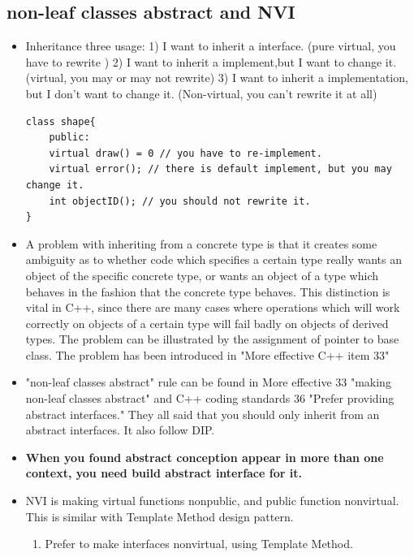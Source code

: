 \documentclass[a4paper,11pt,twoside]{book}
\begin{document}
\subsection{non-leaf classes abstract and NVI}

\begin{itemize}

\item Inheritance three usage: 1) I want to inherit a interface. (pure virtual, you have to rewrite ) 2) I want to inherit a implement,but I want to change it. (virtual, you may or may not rewrite) 3) I want to inherit a implementation, but I don't want to change it. (Non-virtual, you can't rewrite it at all)
\begin{lstlisting}[numbers=none]
class shape{
	public:
	virtual draw() = 0 // you have to re-implement.
	virtual error(); // there is default implement, but you may change it.
	int objectID(); // you should not rewrite it.
}	
\end{lstlisting}

	\item A problem with inheriting from a concrete type is that it creates some ambiguity as to whether code which specifies a certain type really wants an object of the specific concrete type, or wants an object of a type which behaves in the fashion that the concrete type behaves. This distinction is vital in C++, since there are many cases where operations which will work correctly on objects of a certain type will fail badly on objects of derived types. The problem can be illustrated by the assignment of pointer to base class. The problem has been introduced in "More effective C++ item 33"
	

	\item "non-leaf classes abstract" rule can be found in More effective 33 "making non-leaf classes abstract" and C++ coding standards 36 "Prefer providing abstract interfaces." They all said that you should only inherit from an abstract interfaces. It also follow DIP.

	\item \textbf{When you found abstract conception appear in more than one context, you need build abstract interface for it. }


	\item NVI is making virtual functions nonpublic, and public function nonvirtual. This is similar with Template Method design pattern.  

\begin{enumerate}
	\item Prefer to make interfaces nonvirtual, using Template Method.
	

\end{enumerate}
\end{itemize}
\end{document}
